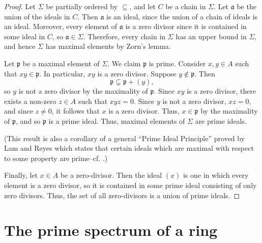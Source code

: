 \begin{proof}
Let $\Sigma$ be partially ordered by $\subseteq$, and let $C$ be a chain in $\Sigma$.
Let $\mathfrak a$ be the union of the ideals in $C$.
Then $\mathfrak a$ is an ideal, since the union of a chain of ideals is an ideal.
Moreover, every element of $\mathfrak a$ is a zero divisor since it is contained in some ideal in $C$, so $\mathfrak a \in \Sigma$.
Therefore, every chain in $\Sigma$ has an upper bound in $\Sigma$, and hence $\Sigma$ has maximal elements by Zorn's lemma.

Let $\mathfrak p$ be a maximal element of $\Sigma$.
We claim $\mathfrak p$ is prime.
Consider $x,y\in A$ such that $x y \in \mathfrak p$.
In particular, $x y$ is a zero divisor.
Suppose $y \notin \mathfrak p$.
Then
\begin{equation*}
\mathfrak p \subsetneq \mathfrak p + (y),
\end{equation*}
so $y$ is not a zero divisor by the maximality of $\mathfrak p$.
Since $x y$ is a zero divisor, there exists a non-zero $z \in A$ such that $x y z = 0$.
Since $y$ is not a zero divisor, $x z = 0$, and since $z \neq 0$, it follows that $x$ is a zero divisor.
Thus, $x \in \mathfrak p$ by the maximality of $\mathfrak p$, and so $\mathfrak p$ is a prime ideal.
Thus, maximal elements of $\Sigma$ are prime ideals.

(This result is also a corollary of a general ``Prime Ideal Principle'' proved by Lam and Reyes which states that certain ideals which are maximal with respect to some property are prime--cf. \cite[Corollary 3.2]{LamReyesPrimeIdealPrinciple}.)

Finally, let $x\in A$ be a zero-divisor.
Then the ideal $(x)$ is one in which every element is a zero divisor, so it is contained in some prime ideal consisting of only zero divisors.
Thus, the set of all zero-divisors is a union of prime ideals.
\end{proof}





\section*{The prime spectrum of a ring}


